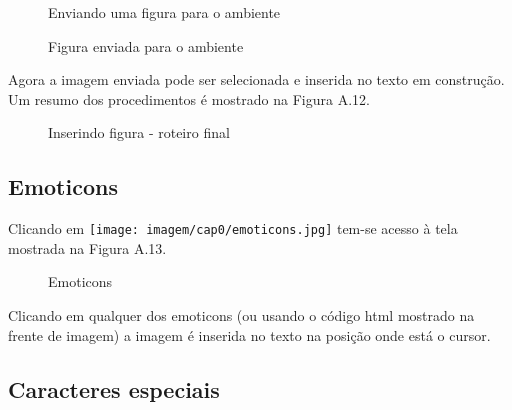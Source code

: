 
\begin{figure}
 \begin{center}
  \caption{Enviando uma figura para o ambiente}
 \end{center}
\end{figure}

\begin{figure}
 \begin{center}
  \caption{Figura enviada para o ambiente}
 \end{center}
\end{figure}

Agora a imagem enviada pode ser selecionada e inserida no texto em construção. Um resumo dos procedimentos é mostrado na Figura A.12.

\begin{figure}
 \begin{center}
  \caption{Inserindo figura - roteiro final}
 \end{center}
\end{figure}

\subsection{Emoticons}


Clicando em \texttt{[image: imagem/cap0/emoticons.jpg]} tem-se acesso à tela mostrada na Figura A.13.

\begin{figure}
 \begin{center}
  \caption{Emoticons}
 \end{center}
\end{figure}

Clicando em qualquer dos emoticons (ou usando o código html mostrado na frente de imagem) a imagem é inserida no texto na posição onde está o cursor.

\subsection{Caracteres especiais}


